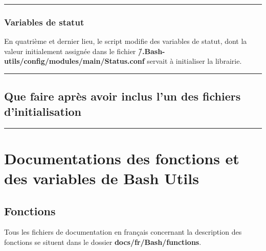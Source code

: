 \documentclass[a4paper,10pt]{article}
\begin{document}
\color{blue}\par\noindent\rule{\textwidth}{0.4pt}\color{white}

\color{blue}
\subsubsection{Variables de statut}\color{white}

\begin{justify}
    En quatrième et dernier lieu, le script modifie des variables de statut, dont la valeur initialement assignée dans le fichier \textbf{\color{lime}\~/.Bash-utils/config/modules/main/Status.conf} servait à initialiser la librairie.
\end{justify}




\color{green}\par\noindent\rule{\textwidth}{0.4pt}\color{white}

\color{green}
\subsection{Que faire après avoir inclus l'un des fichiers d'initialisation}\color{white}





\color{red}\par\noindent\rule{\textwidth}{0.4pt}\color{white}

\color{red}
\section{Documentations des fonctions et des variables de Bash Utils}\color{white}

\color{green}
\subsection{Fonctions}\color{white}

\begin{justify}
    Tous les fichiers de documentation en français concernant la description des fonctions se situent dans le dossier \textbf{\color{lime}docs/fr/Bash/functions}.
\end{justify}
\end{document}
